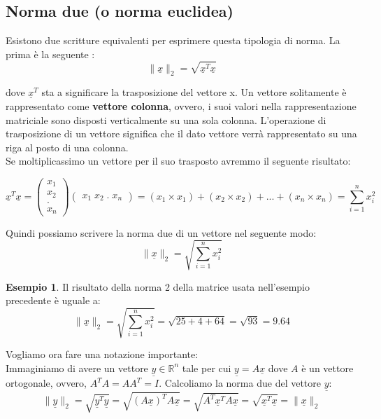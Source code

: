 \documentclass[12pt, a4paper]{book}
\theoremstyle{definition}
\newtheorem{exmp}{Esempio}[section]
\newcommand{\VarMtrx}[1]{\ensuremath{\underline{#1}}}
\begin{document}
\subsection{Norma due (o norma euclidea)}
\begin{flushleft}
Esistono due scritture equivalenti per esprimere questa tipologia di norma.  La prima è la seguente : 
\[ \lVert\VarMtrx{x}\rVert_{2} = \sqrt{\VarMtrx{x}^{T}\VarMtrx{x}} \]

dove $\VarMtrx{x}^{T}$ sta a significare la trasposizione del vettore x. 
Un vettore solitamente è rappresentato come \textbf{vettore colonna}, ovvero, i suoi valori nella rappresentazione matriciale sono disposti verticalmente su una  sola colonna. L'operazione di trasposizione di un vettore significa che il dato vettore verrà rappresentato su una riga al posto di una colonna. \\
\vspace{1em}
Se moltiplicassimo un vettore per il suo trasposto avremmo il seguente risultato: 

\[ 
	 \VarMtrx{x}^{T}\VarMtrx{x} = \begin{pmatrix} x_{1} \\ x_{2} \\ .\\ x_{n}  \end{pmatrix} \begin{pmatrix} x_{1} \; x_{2} \; . \; x_{n}  \end{pmatrix}  = 
	 (x_{1} \times x_{1}) + (x_{2} \times x_{2}) + ...  + (x_{n} \times x_{n})
	 = \sum_{i=1}^{n} x_{i}^{2}
\]

Quindi possiamo scrivere la norma due di un vettore nel seguente modo: 
\[ \lVert\VarMtrx{x}\rVert_{2} = \sqrt{\sum_{i=1}^{n} x_{i}^{2}} \]

\begin{exmp}
Il risultato della norma 2 della matrice usata nell'esempio precedente è uguale a: 
\[ \lVert\VarMtrx{x}\rVert_{2}  = \sqrt{\sum_{i=1}^{n} x_{i}^{2}}  = \sqrt{25 + 4 + 64} = \sqrt{93} = 9.64 \]
\end{exmp}

Vogliamo ora fare una notazione importante:\\
Immaginiamo di avere un vettore $\VarMtrx{y} \in \mathbb{R}^{n}$ tale per cui $\VarMtrx{y} = A\VarMtrx{x}$ dove $A$ è un vettore ortogonale, ovvero,  $A^{T}A = AA^{T} = I$.
\vspace{1em}
Calcoliamo la norma due del vettore \VarMtrx{y}:
\[ \lVert\VarMtrx{y}\rVert_{2}  = \sqrt{\VarMtrx{y}^{T}\VarMtrx{y}} = \sqrt{(A\VarMtrx{x})^{T}A\VarMtrx{x}}  = \sqrt{A^{T}\VarMtrx{x}^{T}A\VarMtrx{x}} = \sqrt{\VarMtrx{x}^{T}\VarMtrx{x}} = \lVert\VarMtrx{x}\rVert_{2}\]
\end{flushleft}
\end{document}
